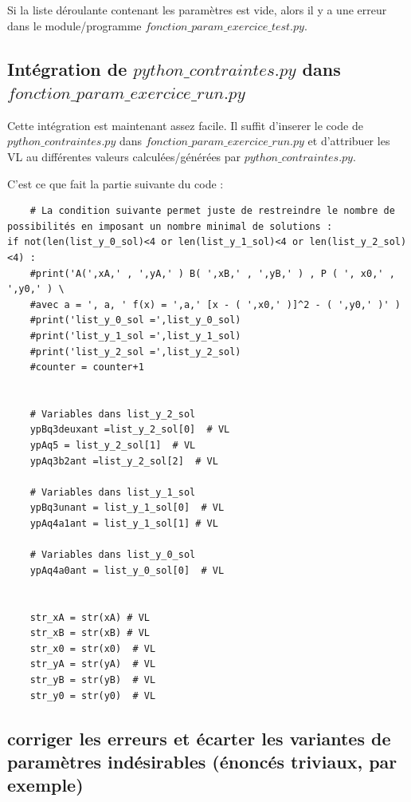 {\begin{dsxl}
 Si la liste déroulante contenant les paramètres est vide, alors il y a une erreur dans le module/programme {\bf $fonction\_param\_exercice\_test.py$}. 
\end{dsxl}

\subsection{Intégration de {\bf $python\_contraintes.py$} dans  {\bf $fonction\_param\_exercice\_run.py$}}

Cette intégration est maintenant assez facile. Il suffit d'inserer le code  de {\bf $python\_contraintes.py$} dans {\bf $fonction\_param\_exercice\_run.py$} 
et d'attribuer les VL au différentes valeurs calculées/générées par {\bf $python\_contraintes.py$}.

C'est ce que fait la partie suivante du code :

\begin{verbatim}
    # La condition suivante permet juste de restreindre le nombre de possibilités en imposant un nombre minimal de solutions : 
if not(len(list_y_0_sol)<4 or len(list_y_1_sol)<4 or len(list_y_2_sol)<4) : 
    #print('A(',xA,' , ',yA,' ) B( ',xB,' , ',yB,' ) , P ( ', x0,' , ',y0,' ) \
    #avec a = ', a, ' f(x) = ',a,' [x - ( ',x0,' )]^2 - ( ',y0,' )' )
    #print('list_y_0_sol =',list_y_0_sol)
    #print('list_y_1_sol =',list_y_1_sol)
    #print('list_y_2_sol =',list_y_2_sol)
    #counter = counter+1


    # Variables dans list_y_2_sol
    ypBq3deuxant =list_y_2_sol[0]  # VL
    ypAq5 = list_y_2_sol[1]  # VL
    ypAq3b2ant =list_y_2_sol[2]  # VL

    # Variables dans list_y_1_sol
    ypBq3unant = list_y_1_sol[0]  # VL
    ypAq4a1ant = list_y_1_sol[1] # VL
    
    # Variables dans list_y_0_sol
    ypAq4a0ant = list_y_0_sol[0]  # VL
    

    str_xA = str(xA) # VL
    str_xB = str(xB) # VL
    str_x0 = str(x0)  # VL
    str_yA = str(yA)  # VL
    str_yB = str(yB)  # VL        
    str_y0 = str(y0)  # VL    

\end{verbatim}

\subsection{corriger les erreurs et écarter les variantes de paramètres indésirables (énoncés triviaux, par exemple)} 

}
